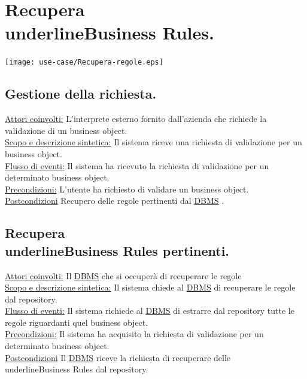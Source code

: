 \section{Recupera \\underline{Business Rules}.}
\begin{center}
 \texttt{[image: use-case/Recupera-regole.eps]}\
\end{center}

\subsection{Gestione della richiesta.}
\underline{Attori coinvolti:} L'interprete esterno fornito dall'azienda che richiede la validazione di un business object.\\
\underline{Scopo e descrizione sintetica:} Il sistema riceve una richiesta di validazione per un business object.\\
\underline{Flusso di eventi:} Il sistema ha ricevuto la richiesta di validazione per un determinato business object.\\
\underline{Precondizioni:} L'utente ha richiesto di validare un business object.\\
\underline{Postcondizioni} Recupero delle regole pertinenti dal \underline{DBMS} .

\subsection{Recupera \\underline{Business Rules} pertinenti.}
\underline{Attori coinvolti:} Il \underline{DBMS} che si occuper\`a di recuperare le regole\\
\underline{Scopo e descrizione sintetica:} Il sistema chiede al \underline{DBMS} di recuperare le regole dal repository.\\
\underline{Flusso di eventi:} Il sistema richiede al \underline{DBMS} di estrarre dal repository tutte le regole riguardanti quel business object.\\
\underline{Precondizioni:} Il sistema ha acquisito la richiesta di validazione per un determinato business object.\\
\underline{Postcondizioni} Il \underline{DBMS} riceve la richiesta di recuperare delle \\underline{Business Rules} dal repository.
